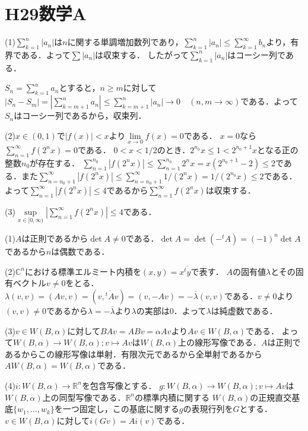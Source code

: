 \documentclass[
		book,
		head_space=20mm,
		foot_space=20mm,
		gutter=10mm,
		line_length=190mm
]{jlreq}
\begin{document}
\section{H29数学A}
(1)$\sum\limits_{k=1}^n|a_n|$は$n$に関する単調増加数列であり，$\sum\limits_{k=1}^n|a_n|\le \sum\limits_{k=1}^\infty b_n$より，有界である．よって$\sum |a_n|$は収束する．
したがって$\sum\limits_{k=1}^n|a_n|$はコーシー列である．

$S_n=\sum\limits_{k=1}^n a_n$とすると，$n\ge m$に対して
$|S_n-S_m|=|\sum\limits_{k=m+1}^n a_n|\le \sum\limits_{k=m+1}^n|a_n|\rightarrow 0\quad(n,m\rightarrow\infty)$である．よって$S_n$はコーシー列であるから，収束列．

(2)$x\in(0,1)$で$|f(x)|<x$より$\lim\limits_{x\rightarrow 0}f(x)=0$である．
$x=0$なら$\sum\limits_{n=1}^\infty f(2^nx)=0$である．
$0<x<1/2$のとき．$2^{n_0}x\le 1 < 2^{n_0+1}x$となる正の整数$n_0$が存在する．
$\sum\limits_{n=1}^{n_0}|f(2^nx)|\le \sum\limits_{n=1}^{n_0}2^nx=x(2^{n_0+1}-2)\le 2$である．また$\sum\limits_{n=n_0+1}^\infty |f(2^nx)|\le \sum\limits_{n=n_0+1}^\infty 1/(2^n x)=1/(2^{n_0}x)\le2 $である．よって$\sum\limits_{n=1}^\infty |f(2^nx)|\le4$であるから$\sum\limits_{n=1}^\infty f(2^nx)$は収束する．

(3)$\sup\limits_{x\in[0,\infty)} |\sum\limits_{n=1}^\infty f(2^n x)|\le4$である．

(1)$A$は正則であるから$\det A \neq 0$である．$\det A=\det(-^t\!A)=(-1)^n\det A$であるから$n$は偶数である．

(2)$\mathbb{C}^n$における標準エルミート内積を$(x,y)=x \overline{^t\!y}$で表す．
$A$の固有値$\lambda$とその固有ベクトル$v \neq 0$をとる．$\lambda(v,v)=(Av,v)=(v,\overline{^t\!A}v)=(v,-Av)=-\overline{\lambda}(v,v)$である．$v\neq 0$より$(v,v)\neq 0$であるから$\lambda=-\overline{\lambda}$より$\lambda$の実部は$0$．よって$\lambda$は純虚数である．

(3)$v \in W(B,\alpha)$に対して$BAv=ABv=\alpha Av$より$Av \in W(B,\alpha)$である．
よって$W(B,\alpha)\rightarrow W(B,\alpha);v \mapsto Av$は$W(B,\alpha)$上の線形写像である．$A$は正則であるからこの線形写像は単射．有限次元であるから全単射であるから$AW(B,\alpha)=W(B,\alpha)$である．

(4)$ i\colon W(B,\alpha)\rightarrow \mathbb{R}^n$を包含写像とする．
$g\colon W(B,\alpha)\rightarrow W(B,\alpha);v \mapsto Av$は$W(B,\alpha)$上の同型写像である．$\mathbb{R}^n$の標準内積に関する $ W(B,\alpha)$の正規直交基底$\{w_1,\dots,w_k\}$を一つ固定し，この基底に関する$g$の表現行列を$G$とする．$v \in W(B,\alpha)$に対して$i(Gv)=Ai(v)$である．
\end{document}
